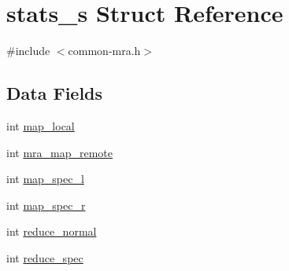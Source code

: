\hypertarget{structstats__s}{\section{stats\-\_\-s \-Struct \-Reference}
\label{structstats__s}
}


{\ttfamily \#include $<$common-\/mra.\-h$>$}

\subsection*{\-Data \-Fields}
\begin{DoxyCompactItemize}
\item 
int \hyperlink{structstats__s_ac3b2752238687f8f231dc7ee3fb66126}{map\-\_\-local}
\item 
int \hyperlink{structstats__s_ae49231fe6e7f535421d0b0cc63af8324}{mra\-\_\-map\-\_\-remote}
\item 
int \hyperlink{structstats__s_a8928364ec78465521407e3978bb0256b}{map\-\_\-spec\-\_\-l}
\item 
int \hyperlink{structstats__s_aaa36a987438e3743fb4fddf2e3b766ac}{map\-\_\-spec\-\_\-r}
\item 
int \hyperlink{structstats__s_ac416c784bd8cc7f6ff36fc0424a3e3bc}{reduce\-\_\-normal}
\item 
int \hyperlink{structstats__s_a72a455323e2db452773d6e4d21fe8554}{reduce\-\_\-spec}
\end{DoxyCompactItemize}


